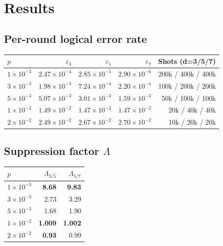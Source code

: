 \documentclass[11pt]{article}
\begin{document}
\section{Results}

\subsection{Per-round logical error rate}
\begin{center}\small
\begin{tabular}{lrrrr}
\toprule
$p$ & $\varepsilon_3$ & $\varepsilon_5$ & $\varepsilon_7$ & Shots (d=3/5/7) \\
\midrule
$1\!\times\!10^{-3}$ & $2.47\!\times\!10^{-4}$ & $2.85\!\times\!10^{-5}$ & $2.90\!\times\!10^{-6}$ & 200k / 400k / 400k \\
$3\!\times\!10^{-3}$ & $1.98\!\times\!10^{-3}$ & $7.24\!\times\!10^{-4}$ & $2.20\!\times\!10^{-4}$ & 100k / 200k / 200k \\
$5\!\times\!10^{-3}$ & $5.07\!\times\!10^{-3}$ & $3.01\!\times\!10^{-3}$ & $1.59\!\times\!10^{-3}$ & 50k / 100k / 100k \\
$1\!\times\!10^{-2}$ & $1.49\!\times\!10^{-2}$ & $1.47\!\times\!10^{-2}$ & $1.47\!\times\!10^{-2}$ & 20k / 40k / 40k \\
$2\!\times\!10^{-2}$ & $2.49\!\times\!10^{-2}$ & $2.67\!\times\!10^{-2}$ & $2.70\!\times\!10^{-2}$ & 10k / 20k / 20k \\
\bottomrule
\end{tabular}
\end{center}

\subsection{Suppression factor \texorpdfstring{$\Lambda$}{Lambda}}
\begin{center}
\begin{tabular}{lrr}
\toprule
$p$ & $\Lambda_{3/5}$ & $\Lambda_{5/7}$ \\
\midrule
$1\!\times\!10^{-3}$ & \textbf{8.68} & \textbf{9.83} \\
$3\!\times\!10^{-3}$ & 2.73         & 3.29 \\
$5\!\times\!10^{-3}$ & 1.68         & 1.90 \\
$1\!\times\!10^{-2}$ & \textbf{1.009} & \textbf{1.002} \\
$2\!\times\!10^{-2}$ & \textbf{0.93} & 0.99 \\
\bottomrule
\end{tabular}
\end{center}
\end{document}
